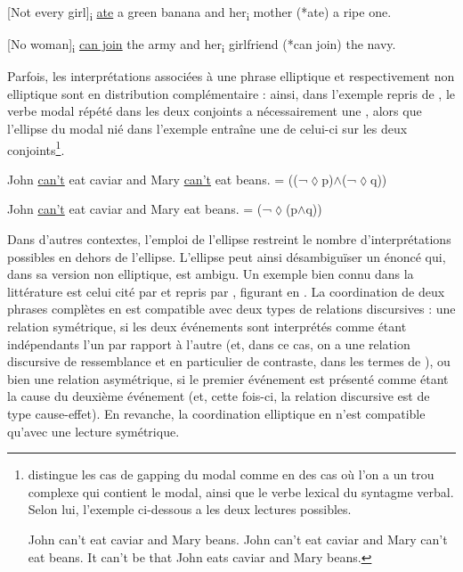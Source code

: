 \ea \label{ch1:ex5}
\ea{} [Not every girl]\textsubscript{i} \uline{ate} a green banana and her\textsubscript{i} mother (*ate) a ripe one. 

\ex{} [No woman]\textsubscript{i} \uline{can join} the army and her\textsubscript{i} girlfriend (*can join) the navy. 
\z
\z

\largerpage[2]
Parfois, les interprétations associées à une phrase elliptique et respectivement non elliptique sont en distribution complémentaire : ainsi, dans l’exemple  repris de \citet{Siegel1984,Siegel1987}, le verbe modal répété dans les deux conjoints a nécessairement une , alors que l’ellipse du modal nié dans l’exemple  entraîne une  de celui-ci sur les deux conjoints\footnote{\citet{Siegel1984,Siegel1987} distingue les cas de gapping du modal comme en  des cas où l’on a un trou complexe qui contient le modal, ainsi que le verbe lexical du syntagme verbal. Selon lui, l’exemple  ci-dessous a les deux lectures possibles.

\ea John can’t eat caviar and Mary beans.\label{ch1:foot4:ex1}
\ea John can’t eat caviar and Mary can’t eat beans.
\ex It can’t be that John eats caviar and Mary beans.
\z
\z
}. 


\ea 
\ea  John \uline{can’t} eat caviar and Mary \uline{can’t} eat beans. = ((¬${\lozenge}$p)${\land}$(¬${\lozenge}$q)) \label{ch1:ex6a}

\ex  John \uline{can’t} eat caviar and Mary eat beans. = (¬${\lozenge}$(p${\land}$q)) \label{ch1:ex6b}
\z
\z

Dans d’autres contextes, l’emploi de l’ellipse restreint le nombre d’interpréta\-tions possibles en dehors de l’ellipse. L’ellipse peut ainsi désambiguïser un énon\-cé qui, dans sa version non elliptique, est ambigu. Un exemple bien connu dans la littérature est celui cité par \citet{LevinEtAl1986} et repris par \citet{Kehler2002}, figurant en . La coordination de deux phrases complètes en  est compatible avec deux types de relations discursives : une relation symétrique, si les deux événements sont interprétés comme étant indépendants l’un par rapport à l’autre (et, dans ce cas, on a une relation discursive de ressemblance et en particulier de contraste, dans les termes de \citealt{Kehler2002}), ou bien une relation asymétrique, si le premier événement est présenté comme étant la cause du deuxième événement (et, cette fois-ci, la relation discursive est de type cause-effet). En revanche, la coordination elliptique en  n’est compatible qu’avec une lecture symétrique. 

